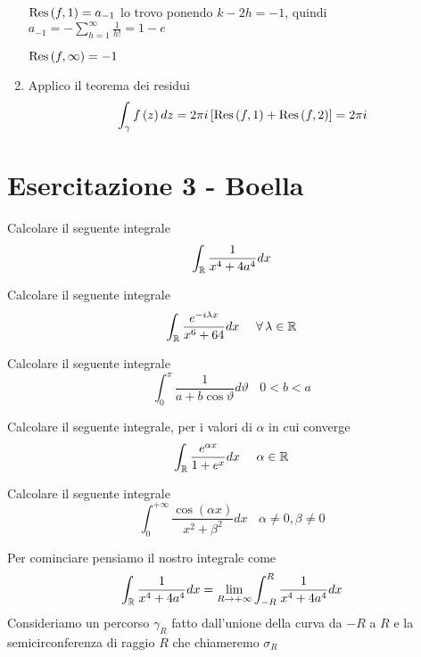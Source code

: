 \begin{enumerate}
$\operatorname{Res} \left(f,1\right) = a_{ - 1}$ lo trovo ponendo $k - 2h = -1$, quindi $a_{ - 1} = - \sum\limits ^{\infty }_{h = 1}\frac{1}{h!} = 1 - e$

$\operatorname{Res} \left(f,\infty \right) = - 1$
\item Applico il teorema dei residui
\begin{equation*}
\int\nolimits _{\gamma } f\left(z\right) dz = 2\pi i\left[\operatorname{Res} \left(f,1\right) + \operatorname{Res} \left(f,2\right)\right] = 2\pi i
\end{equation*}
\end{enumerate}
\chapter{Esercitazione 3 - Boella}
\ParteEsercizi
\Esercizio{}

Calcolare il seguente integrale
\begin{equation*}
\int _{\mathbb{R} }\frac{1}{x^{4} + 4a^{4}} dx
\end{equation*}
\Esercizio{}

Calcolare il seguente integrale
\begin{equation*}
\int _{\RR }\frac{e^{ - i\lambda x}}{x^{6} + 64} dx\ \ \ \ \forall \lambda \in \RR 
\end{equation*}
\Esercizio{}

Calcolare il seguente integrale
\begin{equation*}
\int ^{\pi }_{0}\frac{1}{a + b\cos \vartheta } d\vartheta \ \ \ \ 0 < b < a
\end{equation*}
\Esercizio{}

Calcolare il seguente integrale, per i valori di $\alpha $ in cui converge
\begin{equation*}
\int _{\mathbb{R} }\frac{e^{\alpha x}}{1 + e^{x}} dx\ \ \ \ \alpha \in \mathbb{R} 
\end{equation*}
\Esercizio{}

Calcolare il seguente integrale
\begin{equation*}
\int ^{ + \infty }_{0}\frac{\cos\left(\alpha x\right)}{x^{2} + \beta ^{2}} dx\ \ \ \ \alpha \neq 0,\beta \neq 0
\end{equation*}
\ParteSoluzioni
\Soluzione

Per cominciare pensiamo il nostro integrale come
\begin{equation*}
\int _{\mathbb{R} }\frac{1}{x^{4} + 4a^{4}} dx = \lim\limits _{R\rightarrow + \infty }\int ^{R}_{ - R}\frac{1}{x^{4} + 4a^{4}} dx
\end{equation*}
Consideriamo un percorso $\gamma _{R}$ fatto dall'unione della curva da $ - R$ a $R$ e la semicirconferenza di raggio $R$ che chiameremo $\sigma _{R}$



